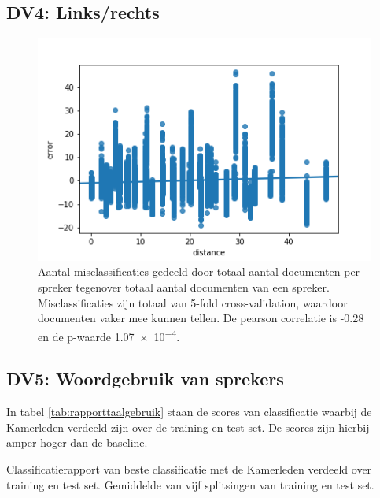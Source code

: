\subsection{DV4: Links/rechts}
\begin{figure}[H]
  \centering
    \includegraphics[width=0.60\paperwidth]{Verslag/Tables/Ideology.png}
\caption{Aantal misclassificaties gedeeld door totaal aantal documenten per spreker tegenover totaal aantal documenten van een spreker. Misclassificaties zijn totaal van 5-fold cross-validation, waardoor documenten vaker mee kunnen tellen. De pearson correlatie is -0.28 en de p-waarde \num{1.07e-4}.}
\label{fig:misclassifiedsprekers}
\end{figure}

\subsection{DV5: Woordgebruik van sprekers}
In tabel \ref{tab:rapporttaalgebruik} staan de scores van classificatie waarbij de Kamerleden verdeeld zijn over de training en test set. De scores zijn hierbij amper hoger dan de baseline.
\begin{table}[H]
\caption{Classificatierapport van beste classificatie met de Kamerleden verdeeld over training en test set. Gemiddelde van vijf splitsingen van training en test set.}
\label{tab:rapporttaalgebruik}
\centering

\end{table}

